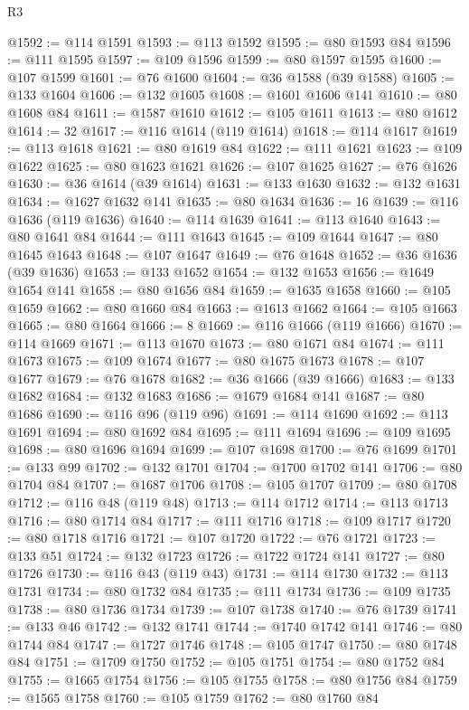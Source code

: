\begin{lexlean}{R3}
\begin{coremodule}
@1592 := @114 @1591
@1593 := @113 @1592
@1595 := @80 @1593 @84
@1596 := @111 @1595
@1597 := @109 @1596
@1599 := @80 @1597 @1595
@1600 := @107 @1599
@1601 := @76 @1600
@1604 := @36 @1588 (@39 @1588)
@1605 := @133 @1604
@1606 := @132 @1605
@1608 := @1601 @1606 @141
@1610 := @80 @1608 @84
@1611 := @1587 @1610
@1612 := @105 @1611
@1613 := @80 @1612
@1614 := 32
@1617 := @116 @1614 (@119 @1614)
@1618 := @114 @1617
@1619 := @113 @1618
@1621 := @80 @1619 @84
@1622 := @111 @1621
@1623 := @109 @1622
@1625 := @80 @1623 @1621
@1626 := @107 @1625
@1627 := @76 @1626
@1630 := @36 @1614 (@39 @1614)
@1631 := @133 @1630
@1632 := @132 @1631
@1634 := @1627 @1632 @141
@1635 := @80 @1634
@1636 := 16
@1639 := @116 @1636 (@119 @1636)
@1640 := @114 @1639
@1641 := @113 @1640
@1643 := @80 @1641 @84
@1644 := @111 @1643
@1645 := @109 @1644
@1647 := @80 @1645 @1643
@1648 := @107 @1647
@1649 := @76 @1648
@1652 := @36 @1636 (@39 @1636)
@1653 := @133 @1652
@1654 := @132 @1653
@1656 := @1649 @1654 @141
@1658 := @80 @1656 @84
@1659 := @1635 @1658
@1660 := @105 @1659
@1662 := @80 @1660 @84
@1663 := @1613 @1662
@1664 := @105 @1663
@1665 := @80 @1664
@1666 := 8
@1669 := @116 @1666 (@119 @1666)
@1670 := @114 @1669
@1671 := @113 @1670
@1673 := @80 @1671 @84
@1674 := @111 @1673
@1675 := @109 @1674
@1677 := @80 @1675 @1673
@1678 := @107 @1677
@1679 := @76 @1678
@1682 := @36 @1666 (@39 @1666)
@1683 := @133 @1682
@1684 := @132 @1683
@1686 := @1679 @1684 @141
@1687 := @80 @1686
@1690 := @116 @96 (@119 @96)
@1691 := @114 @1690
@1692 := @113 @1691
@1694 := @80 @1692 @84
@1695 := @111 @1694
@1696 := @109 @1695
@1698 := @80 @1696 @1694
@1699 := @107 @1698
@1700 := @76 @1699
@1701 := @133 @99
@1702 := @132 @1701
@1704 := @1700 @1702 @141
@1706 := @80 @1704 @84
@1707 := @1687 @1706
@1708 := @105 @1707
@1709 := @80 @1708
@1712 := @116 @48 (@119 @48)
@1713 := @114 @1712
@1714 := @113 @1713
@1716 := @80 @1714 @84
@1717 := @111 @1716
@1718 := @109 @1717
@1720 := @80 @1718 @1716
@1721 := @107 @1720
@1722 := @76 @1721
@1723 := @133 @51
@1724 := @132 @1723
@1726 := @1722 @1724 @141
@1727 := @80 @1726
@1730 := @116 @43 (@119 @43)
@1731 := @114 @1730
@1732 := @113 @1731
@1734 := @80 @1732 @84
@1735 := @111 @1734
@1736 := @109 @1735
@1738 := @80 @1736 @1734
@1739 := @107 @1738
@1740 := @76 @1739
@1741 := @133 @46
@1742 := @132 @1741
@1744 := @1740 @1742 @141
@1746 := @80 @1744 @84
@1747 := @1727 @1746
@1748 := @105 @1747
@1750 := @80 @1748 @84
@1751 := @1709 @1750
@1752 := @105 @1751
@1754 := @80 @1752 @84
@1755 := @1665 @1754
@1756 := @105 @1755
@1758 := @80 @1756 @84
@1759 := @1565 @1758
@1760 := @105 @1759
@1762 := @80 @1760 @84

\end{coremodule}
\end{lexlean}
